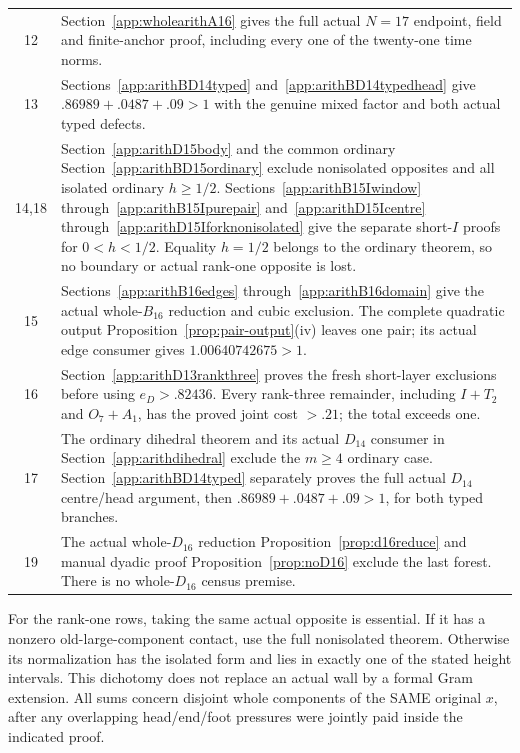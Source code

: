 \begin{longtable}{cp{10.3cm}}
12&Section~\ref{app:wholearithA16}
gives the full actual \(N=17\)
endpoint, field and finite-anchor
proof, including every one of
the twenty-one time norms.\\
13&Sections~\ref{app:arithBD14typed}
and~\ref{app:arithBD14typedhead}
give \(.86989+.0487+.09>1\)
with the genuine mixed factor
and both actual typed defects.\\
14,18&Section~\ref{app:arithD15body}
and the common ordinary
Section~\ref{app:arithBD15ordinary}
exclude nonisolated opposites and
all isolated ordinary \(h\ge1/2\).
Sections~\ref{app:arithB15Iwindow}
through~\ref{app:arithB15Ipurepair}
and~\ref{app:arithD15Icentre}
through~\ref{app:arithD15Iforknonisolated}
give the separate short-\(I\)
proofs for \(0<h<1/2\).
Equality \(h=1/2\) belongs to the
ordinary theorem, so no boundary
or actual rank-one opposite is lost.\\
15&Sections~\ref{app:arithB16edges}
through~\ref{app:arithB16domain}
give the actual whole-\(B_{16}\)
reduction and cubic exclusion.
The complete quadratic output
Proposition~\ref{prop:pair-output}(iv)
leaves one pair; its actual edge
consumer gives \(1.00640742675>1\).\\
16&Section~\ref{app:arithD13rankthree}
proves the fresh short-layer
exclusions before using
\(e_D>.82436\).
Every rank-three remainder,
including \(I+T_2\) and
\(O_7+A_1\), has the proved
joint cost \(>.21\);
the total exceeds one.\\
17&The ordinary dihedral theorem
and its actual \(D_{14}\) consumer
in Section~\ref{app:arithdihedral}
exclude the \(m\ge4\) ordinary case.
Section~\ref{app:arithBD14typed}
separately proves the full actual
\(D_{14}\) centre/head argument,
then \(.86989+.0487+.09>1\),
for both typed branches.\\
19&The actual whole-\(D_{16}\)
reduction
Proposition~\ref{prop:d16reduce}
and manual dyadic proof
Proposition~\ref{prop:noD16}
exclude the last forest.
There is no whole-\(D_{16}\) census
premise.\\
\bottomrule
\end{longtable}

For the rank-one rows, taking the
same actual opposite is essential.
If it has a nonzero old-large-component
contact, use the full nonisolated
theorem. Otherwise its normalization
has the isolated form and lies in
exactly one of the stated height
intervals. This dichotomy does not
replace an actual wall by a formal
Gram extension.
All sums concern disjoint whole
components of the SAME original
\(x\), after any overlapping
head/end/foot pressures were jointly
paid inside the indicated proof.


